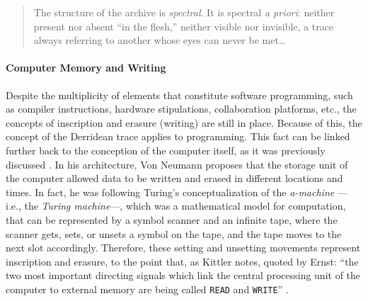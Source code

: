 \begin{quote}
	The structure of the archive is \textit{spectral}. It is spectral \textit{a priori}: neither present nor absent ``in the flesh,'' neither visible nor invisible, a trace always referring to another whose eyes can never be met\dots
\parencite[54]{Der95:Arc}
\end{quote} %

\paragraph{Computer Memory and Writing}
Despite the multiplicity of elements that constitute software programming, such as compiler instructions, hardware stipulations, collaboration platforms, etc., the concepts of inscription and erasure (writing) are still in place. Because of this, the concept of the Derridean trace applies to programming. This fact can be linked further back to the conception of the computer itself, as it was previously discussed . In his architecture, Von Neumann proposes that the storage unit of the computer allowed data to be written and erased in different locations and times. In fact, he was following Turing's conceptualization of the \textit{a-machine} ---i.e., the \textit{Turing machine}---, which was a mathematical model for computation, that can be represented by a symbol scanner and an infinite tape, where the scanner gets, sets, or unsets a symbol on the tape, and the tape moves to the next slot accordingly. Therefore, these setting and unsetting movements represent inscription and erasure, to the point that, as Kittler notes, quoted by Ernst: ``the two most important directing signals which link the central processing unit of the computer to external memory are being called \texttt{READ} and \texttt{WRITE}'' \parencite[131]{Ern13:Dig}.

